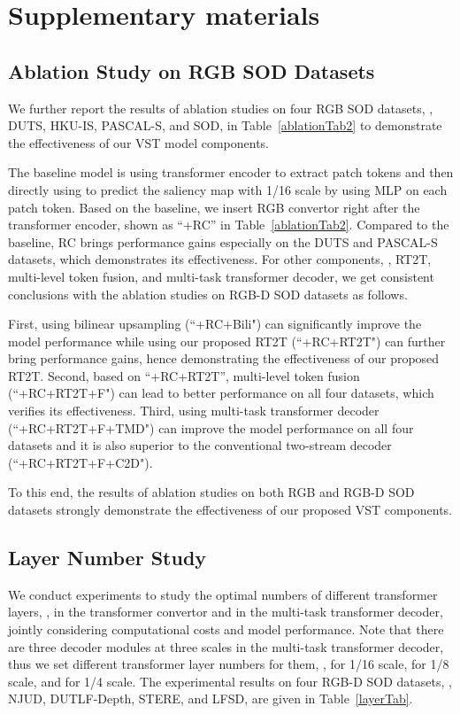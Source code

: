 \documentclass[10pt,twocolumn,letterpaper]{article}
\begin{document}
\section{Supplementary materials}
\subsection{Ablation Study on RGB SOD Datasets}

We further report the results of ablation studies on four RGB SOD datasets, \ie, DUTS, HKU-IS, PASCAL-S, and SOD, in Table~\ref{ablationTab2} to demonstrate the effectiveness of our VST model components.


The baseline model is using transformer encoder to extract patch tokens  and then directly using  to predict the saliency map with 1/16 scale by using MLP on each patch token.
Based on the baseline, we insert RGB convertor right after the transformer encoder, shown as ``+RC'' in Table~\ref{ablationTab2}.
Compared to the baseline, RC brings performance gains especially on the DUTS and PASCAL-S datasets, which demonstrates its effectiveness.
For other components, \ie, RT2T, multi-level token fusion, and multi-task transformer decoder, we get consistent conclusions with the ablation studies on RGB-D SOD datasets as follows.

First, using bilinear upsampling (``+RC+Bili") can significantly improve the model performance while using our proposed RT2T (``+RC+RT2T") can further bring performance gains, hence demonstrating the effectiveness of our proposed RT2T.
Second, based on ``+RC+RT2T'', multi-level token fusion (``+RC+RT2T+F") can lead to better performance on all four datasets, which verifies its effectiveness.
Third, using multi-task transformer decoder (``+RC+RT2T+F+TMD") can improve the model performance on all four datasets and it is also superior to the conventional two-stream decoder (``+RC+RT2T+F+C2D").

To this end, the results of ablation studies on both RGB and RGB-D SOD datasets strongly demonstrate the effectiveness of our proposed VST components.


\subsection{Layer Number Study}
We conduct experiments to study the optimal numbers of different transformer layers, \ie,  in the transformer convertor and  in the multi-task transformer decoder, jointly considering computational costs and model performance. Note that there are three decoder modules at three scales in the multi-task transformer decoder, thus we set different transformer layer numbers for them, \ie,  for 1/16 scale,  for 1/8 scale, and  for 1/4 scale.
The experimental results on four RGB-D SOD datasets, \ie, NJUD, DUTLF-Depth, STERE, and LFSD, are given in Table~\ref{layerTab}.
\end{document}
